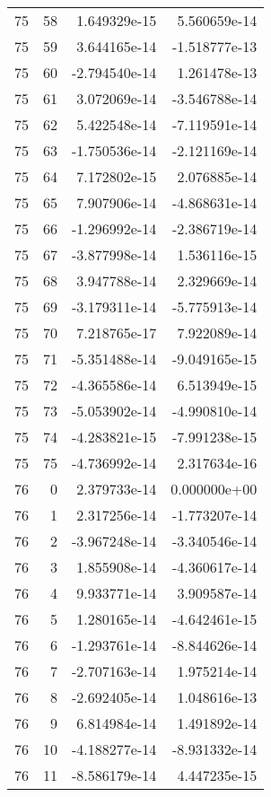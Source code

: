 \begin{tabular}{rrrr}
  75 &   58 &  1.649329e-15 &  5.560659e-14 \\
  75 &   59 &  3.644165e-14 & -1.518777e-13 \\
  75 &   60 & -2.794540e-14 &  1.261478e-13 \\
  75 &   61 &  3.072069e-14 & -3.546788e-14 \\
  75 &   62 &  5.422548e-14 & -7.119591e-14 \\
  75 &   63 & -1.750536e-14 & -2.121169e-14 \\
  75 &   64 &  7.172802e-15 &  2.076885e-14 \\
  75 &   65 &  7.907906e-14 & -4.868631e-14 \\
  75 &   66 & -1.296992e-14 & -2.386719e-14 \\
  75 &   67 & -3.877998e-14 &  1.536116e-15 \\
  75 &   68 &  3.947788e-14 &  2.329669e-14 \\
  75 &   69 & -3.179311e-14 & -5.775913e-14 \\
  75 &   70 &  7.218765e-17 &  7.922089e-14 \\
  75 &   71 & -5.351488e-14 & -9.049165e-15 \\
  75 &   72 & -4.365586e-14 &  6.513949e-15 \\
  75 &   73 & -5.053902e-14 & -4.990810e-14 \\
  75 &   74 & -4.283821e-15 & -7.991238e-15 \\
  75 &   75 & -4.736992e-14 &  2.317634e-16 \\
  76 &    0 &  2.379733e-14 &  0.000000e+00 \\
  76 &    1 &  2.317256e-14 & -1.773207e-14 \\
  76 &    2 & -3.967248e-14 & -3.340546e-14 \\
  76 &    3 &  1.855908e-14 & -4.360617e-14 \\
  76 &    4 &  9.933771e-14 &  3.909587e-14 \\
  76 &    5 &  1.280165e-14 & -4.642461e-15 \\
  76 &    6 & -1.293761e-14 & -8.844626e-14 \\
  76 &    7 & -2.707163e-14 &  1.975214e-14 \\
  76 &    8 & -2.692405e-14 &  1.048616e-13 \\
  76 &    9 &  6.814984e-14 &  1.491892e-14 \\
  76 &   10 & -4.188277e-14 & -8.931332e-14 \\
  76 &   11 & -8.586179e-14 &  4.447235e-15 \\

\end{tabular}
